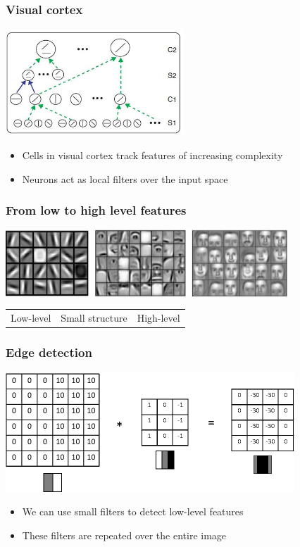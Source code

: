 \documentclass[10pt]{beamer}
\begin{document}
\begin{frame}
\frametitle{Visual cortex}
\centerline{\includegraphics[height=4cm]{images/cortex.png}}
\begin{itemize}
\item Cells in visual cortex track features of increasing complexity
\item Neurons act as {\color{red} local filters} over the input space
\end{itemize}
\end{frame}

\begin{frame}
\frametitle{From low to high level features}
\centerline{\includegraphics[height=2.5cm]{images/features.png}}

\begin{center}
\begin{tabular}{ccc}
Low-level \hspace*{1.1cm} & Small structure & \hspace*{1.4cm} High-level
\end{tabular}
\end{center}
\end{frame}

\begin{frame}
\frametitle{Edge detection}
\centerline{\includegraphics[height=4.5cm]{images/edgedet.png}}
\begin{itemize}
\item We can use small filters to detect low-level features
\item These filters are {\color{red} repeated} over the entire image
\end{itemize}
\end{frame}
\end{document}
